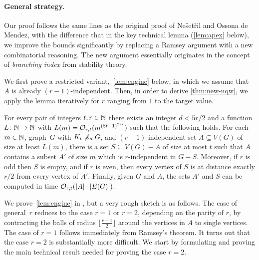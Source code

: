 \paragraph{General strategy.}
Our proof follows the same lines as the original proof of Ne\v set\v ril and Ossona de Mendez, with the difference that in the key technical lemma (\cref{lem:apex} below), 
we improve the bounds significantly by replacing a Ramsey argument with a new combinatorial reasoning.
The new argument essentially originates in the concept of {\em{branching index}} from stability theory. 

We first prove a restricted variant,~\cref{lem:engine} below, in which we assume that $A$ is already $(r-1)$-independent. Then, in order to derive
\cref{thm:new-uqw}, we apply the lemma iteratively for $r$ ranging from $1$ to the target value.

\begin{lemma}\label{lem:engine}
For every pair of integers $t,r\in \mathbb{N}$ there exists an integer $d<5r/2$ and a function $L\colon \mathbb{N}\to \mathbb{N}$ with $L(m)=\mathcal{O}_{r,t}{(m^{{(8t+1)}^{2rt}})}$ such that the following holds.
For each $m\in \mathbb{N}$, graph~$G$ with $K_t\not\preccurlyeq_{d} G$, and
$(r-1)$-independent set $A\subseteq V(G)$ of size at least $L(m)$, there is a set $S\subseteq V(G)-A$ of size at most $t$ such that $A$ contains a subset $A'$ of size $m$ which is $r$-independent in $G-S$.
Moreover, if $r$ is odd then $S$ is empty, and if $r$ is even,
then every vertex of $S$ is at distance exactly $r/2$ from every vertex of $A'$.
Finally, given $G$ and $A$, the sets $A'$ and $S$ can be computed in time $\mathcal{O}_{r,t}(|A|\cdot |E(G)|)$.
\end{lemma}

We prove~\cref{lem:engine} in , but  a very rough sketch is as follows.
The  case of general~$r$ reduces to the case $r=1$ or $r=2$, depending on the parity of $r$,
by contracting the balls of radius $\lfloor \frac {r-1} 2\rfloor $ around the vertices in $A$ to single vertices.
The case of $r=1$ follows immediately from Ramsey's theorem. 
It turns out that the case $r=2$ is substantially more difficult.
We start by formulating and proving the main technical result needed for proving the case $r=2$.

